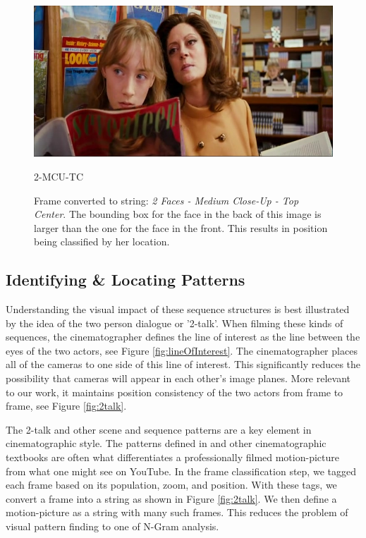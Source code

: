\begin{figure}
\begin{center}
\includegraphics[width=0.98\linewidth]
    {fig/classes/2-MCU-TC.jpg}

\large{2-MCU-TC}
\caption{Frame converted to string: \textit{2 Faces - Medium Close-Up - Top Center}. The bounding box for the face in the back of this image is larger than the one for the face in the front. This results in position being classified by her location.}
\end{center}
\label{fig:tagExample2}
\end{figure}


\subsection{Identifying \& Locating Patterns}
Understanding the visual impact of these sequence structures is best illustrated by the idea of the two person dialogue or '2-talk'. When filming these kinds of sequences, the cinematographer defines the line of interest as the line between the eyes of the two actors, see Figure \ref{fig:lineOfInterest}. The cinematographer places all of the cameras to one side of this line of interest. This significantly reduces the possibility that cameras will appear in each other's image planes. More relevant to our work, it maintains position consistency of the two actors from frame to frame, see Figure \ref{fig:2talk}. 

The 2-talk and other scene and sequence patterns are a key element in cinematographic style. The patterns defined in \cite{arijon_grammar_1991} and other cinematographic textbooks are often what differentiates a professionally filmed motion-picture from what one might see on YouTube. In the frame classification step, we tagged each frame based on its population, zoom, and position. With these tags, we convert a frame into a string as shown in Figure \ref{fig:2talk}. We then define a motion-picture as a string with many such frames. This reduces the problem of visual pattern finding to one of N-Gram analysis.


